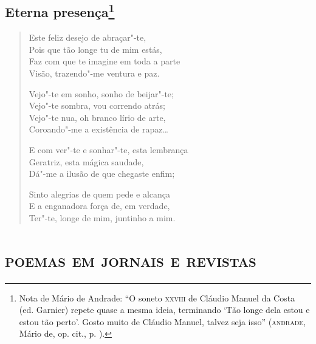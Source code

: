 \chapter[Eterna presença\medskip]{Eterna presença\footnote[*]{Nota de Mário de Andrade: ``O soneto
  \textsc{xxviii} de Cláudio Manuel da Costa (ed. Garnier) repete quase a mesma
  ideia, terminando `Tão longe dela estou e estou tão perto'. Gosto
  muito de Cláudio Manuel, talvez seja isso'' (\textsc{andrade}, Mário de, op.
  cit., p. ).}}

\begin{verse}
Este feliz desejo de abraçar"-te,\\
Pois que tão longe tu de mim estás,\\
Faz com que te imagine em toda a parte\\
Visão, trazendo"-me ventura e paz.

Vejo"-te em sonho, sonho de beijar"-te;\\
Vejo"-te sombra, vou correndo atrás;\\
Vejo"-te nua, oh branco lírio de arte,\\
Coroando"-me a existência de rapaz\ldots{}

E com ver"-te e sonhar"-te, esta lembrança\\
Geratriz, esta mágica saudade,\\
Dá"-me a ilusão de que chegaste enfim;

Sinto alegrias de quem pede e alcança\\
E a enganadora força de, em verdade,\\
Ter"-te, longe de mim, juntinho a mim.
\end{verse}

\paginabranca
{}
\part*{\textsc{poemas em jornais e revistas}}



